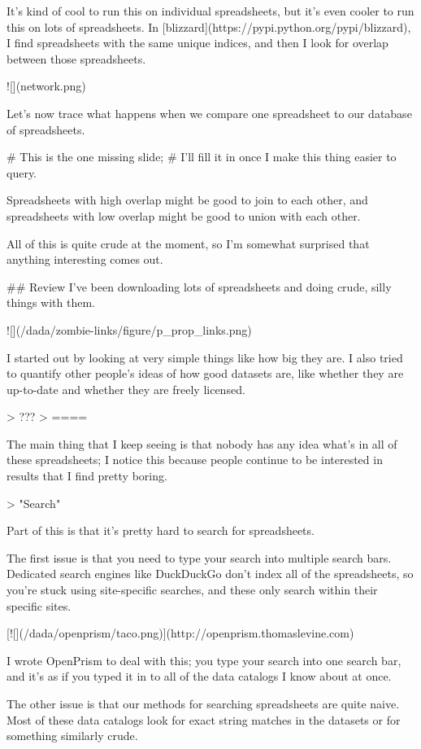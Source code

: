 \documentclass{acm_proc_article-sp}
\begin{document}
It's kind of cool to run this on individual spreadsheets, but it's even cooler
to run this on lots of spreadsheets.
In [blizzard](https://pypi.python.org/pypi/blizzard), I find spreadsheets with
the same unique indices, and then I look for overlap between those spreadsheets.

![](network.png)

Let's now trace what happens when we compare one spreadsheet to our database
of spreadsheets.

    # This is the one missing slide;
    # I'll fill it in once I make this thing easier to query.

Spreadsheets with high overlap might be good to join to each other, and
spreadsheets with low overlap might be good to union with each other.

All of this is quite crude at the moment, so I'm somewhat surprised that
anything interesting comes out.

## Review
I've been downloading lots of spreadsheets and doing crude, silly things
with them.

![](/dada/zombie-links/figure/p_prop_links.png)

I started out by looking at very simple things like how big they are.
I also tried to quantify other people's ideas of how good datasets are,
like whether they are up-to-date and whether they are freely licensed.

> ???
> ====

The main thing that I keep seeing is that nobody has any idea what's in all
of these spreadsheets; I notice this because people continue to be interested
in results that I find pretty boring.

> "Search"

Part of this is that it's pretty hard to search for spreadsheets.

The first issue is that you need to type your search into multiple search
bars. Dedicated search engines like DuckDuckGo don't index all of the
spreadsheets, so you're stuck using site-specific searches, and these only
search within their specific sites.

[![](/dada/openprism/taco.png)](http://openprism.thomaslevine.com)

I wrote OpenPrism to deal with this; you type your search into one search
bar, and it's as if you typed it in to all of the data catalogs I know about
at once.

The other issue is that our methods for searching spreadsheets are quite naive.
Most of these data catalogs look for exact string matches in the datasets or
for something similarly crude.
\end{document}
